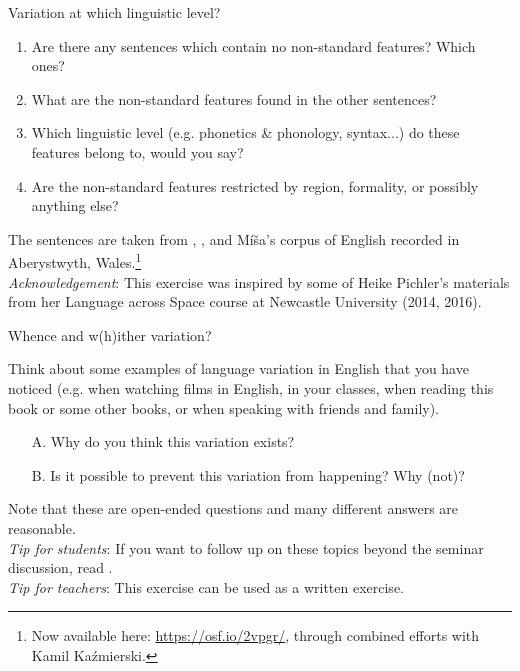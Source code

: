 \begin{exercises}{Variation at which linguistic level?}
\begin{enumerate}
    \item Are there any sentences which contain no non-standard features? Which ones?
	\item What are the non-standard features found in the other sentences?
    \item Which linguistic level (e.g. phonetics \& phonology, syntax...) do these features belong to, would you say?
	\item Are the non-standard features restricted by region, formality, or possibly anything else?
\end{enumerate}

\noindent The sentences are taken from \citet{BealCorrigan2005}, \citet{PichlerLevey2010}, and M\'{i}\v{s}a's corpus of English recorded in Aberystwyth, Wales.\footnote{Now available here: \url{https://osf.io/2vpgr/}, through combined efforts with Kamil Ka\'{z}mierski.}\\ 

\noindent \emph{Acknowledgement}: This exercise was inspired by some of Heike Pichler's materials from her Language across Space course at Newcastle University (2014, 2016).
\end{exercises}

\begin{exercises}{Whence and w(h)ither variation?}
\chili{}

Think about some examples of language variation in English that you have noticed (e.g. when watching films in English, in your classes, when reading this book or some other books, or when speaking with friends and family).
\begin{itemize}
    \item [A.] Why do you think this variation exists?
    \item [B.] Is it possible to prevent this variation from 
    happening? Why (not)?
\end{itemize}

\noindent Note that these are open-ended questions and many different answers are reasonable.\\

\noindent \emph{Tip for students}: If you want to follow up on these topics beyond the seminar discussion, read \citet[chapter 1]{Aitchison2012}.\\

\noindent \emph{Tip for teachers}: This exercise can be used as a written exercise.

\end{exercises}

